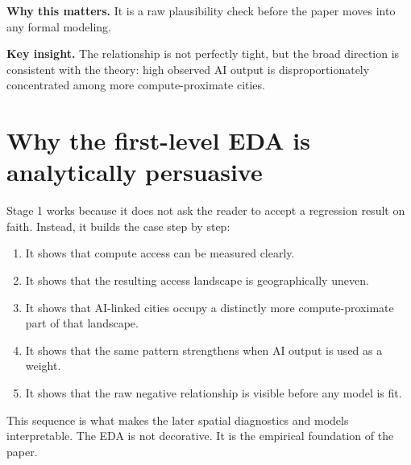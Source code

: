 \documentclass[11pt]{article}
\begin{document}
\textbf{Why this matters.} It is a raw plausibility check before the paper moves into any formal modeling.

\textbf{Key insight.} The relationship is not perfectly tight, but the broad direction is consistent with the theory: high observed AI output is disproportionately concentrated among more compute-proximate cities.

\section{Why the first-level EDA is analytically persuasive}
Stage 1 works because it does not ask the reader to accept a regression result on faith. Instead, it builds the case step by step:
\begin{enumerate}[leftmargin=*]
    \item It shows that compute access can be measured clearly.
    \item It shows that the resulting access landscape is geographically uneven.
    \item It shows that AI-linked cities occupy a distinctly more compute-proximate part of that landscape.
    \item It shows that the same pattern strengthens when AI output is used as a weight.
    \item It shows that the raw negative relationship is visible before any model is fit.
\end{enumerate}

This sequence is what makes the later spatial diagnostics and models interpretable. The EDA is not decorative. It is the empirical foundation of the paper.
\end{document}
